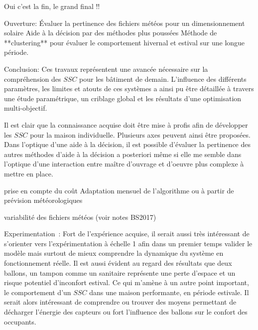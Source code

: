


Oui c’est la fin, le grand final !!

Ouverture:
Évaluer la pertinence des fichiers météos pour un dimensionnement solaire
Aide à la décision par des méthodes plus poussées
Méthode de **clustering** pour évaluer le comportement hivernal et estival sur une
longue période.

Conclusion:
Ces travaux représentent une avancée nécessaire sur la compréhension des $SSC$ pour
les bâtiment de demain. L’influence des différents paramètres, les limites et atouts
de ces systèmes a ainsi pu être détaillée à travers une étude paramétrique, un criblage
global et les résultats d’une optimisation multi-objectif.

Il est clair que la connaissance acquise doit être mise à profis afin de développer
les $SSC$ pour la maison individuelle. Plusieurs axes peuvent ainsi être proposées.
Dans l’optique d’une aide à la décision, il est possible d’évaluer la pertinence
des autres méthodes d’aide à la décision a posteriori même si elle me semble dans
l’optique d’une interaction entre maître d’ouvrage et d’oeuvre plus complexe à mettre
en place.

prise en compte du coût
Adaptation mensuel de l’algorithme ou à partir de prévision météorologiques

variabilité des fichiers météos (voir notes BS2017)

Experimentation~:
Fort de l’expérience acquise, il serait aussi très intéressant de s’orienter vers
l’expérimentation à échelle 1 afin dans un premier temps valider le modèle mais surtout
de mieux comprendre la dynamique du système en fonctionnement réelle.
Il est aussi évident au regard des résultats que deux ballons, un tampon comme un sanitaire
représente une perte d’espace et un risque potentiel d’inconfort estival. Ce qui m’amène à
un autre point important, le comportement d’un $SSC$ dans une maison performante, en période
estivale. Il serait alors intéressant de comprendre ou trouver des moyens permettant de
décharger l’énergie des capteurs ou fort l’influence des ballons sur le confort des occupants.


